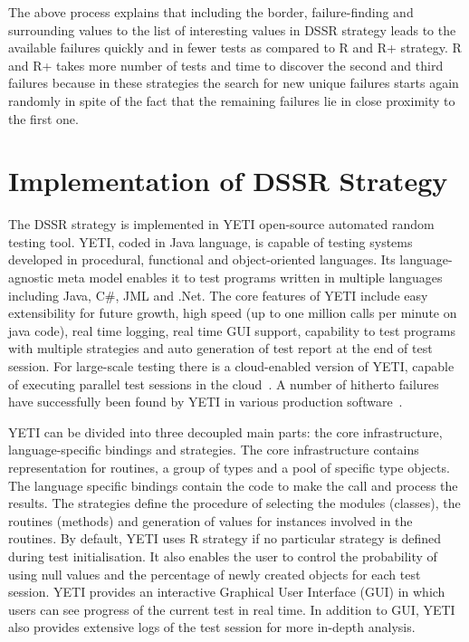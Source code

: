 The above process explains that including the border, failure-finding and surrounding values to the list of interesting values in DSSR strategy leads to the available failures quickly and in fewer tests as compared to R and R+ strategy. R and R+ takes more number of tests and time to discover the second and third failures because in these strategies the search for new unique failures starts again randomly in spite of the fact that the remaining failures lie in close proximity to the first one.




\section{Implementation of DSSR Strategy}\label{sec:imp}

The DSSR strategy is implemented in YETI open-source automated random testing tool. YETI, coded in Java language, is capable of testing systems developed in procedural, functional and object-oriented languages. Its language-agnostic meta model enables it to test programs written in multiple languages including Java, C\#, JML and .Net. The core features of YETI include easy extensibility for future growth, high speed (up to one million calls per minute on java code), real time logging, real time GUI support, capability to test programs with multiple strategies and auto generation of test report at the end of test session. For large-scale testing there is a cloud-enabled version of YETI, capable of executing parallel test sessions in the cloud~\cite{oriol2010yeti}. A number of hitherto failures have successfully been found by YETI in various production software~\cite{oriol2012random}.

YETI can be divided into three decoupled main parts: the core infrastructure, language-specific bindings and strategies. The core infrastructure contains representation for routines, a group of types and a pool of specific type objects. The language specific bindings contain the code to make the call and process the results. The strategies define the procedure of selecting the modules (classes), the routines (methods) and generation of values for instances involved in the routines. By default, YETI uses R strategy if no particular strategy is defined during test initialisation. It also enables the user to control the probability of using null values and the percentage of newly created objects for each test session. YETI provides an interactive Graphical User Interface (GUI) in which users can see progress of the current test in real time. In addition to GUI, YETI also provides extensive logs of the test session for more in-depth analysis.

